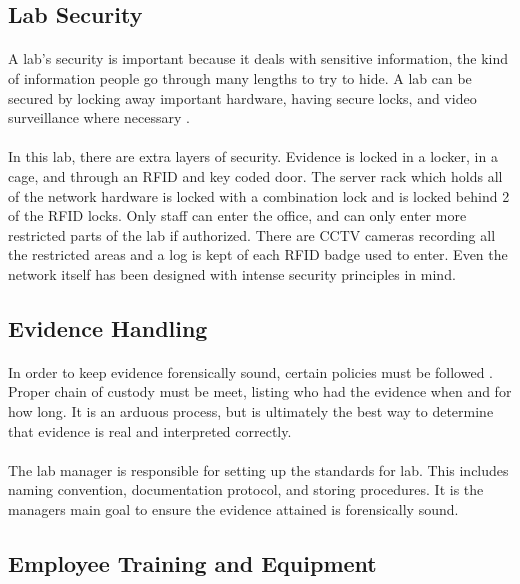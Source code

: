 \documentclass[12pt]{article}
\begin{document}
\subsection{Lab Security}
\paragraph{}
A lab's security is important because it deals with sensitive information, the kind of information people go through many lengths to try to hide.  
A lab can be secured by locking away important hardware, having secure locks, and video surveillance where necessary \cite{website}.
\paragraph{}
In this lab, there are extra layers of security.
Evidence is locked in a locker, in a cage, and through an RFID and key coded door.
The server rack which holds all of the network hardware is locked with a combination lock and is locked behind 2 of the RFID locks.
Only staff can enter the office, and can only enter more restricted parts of the lab if authorized.
There are CCTV cameras recording all the restricted areas and a log is kept of each RFID badge used to enter.
Even the network itself has been designed with intense security principles in mind.

\subsection{Evidence Handling}
\paragraph{}
In order to keep evidence forensically sound, certain policies must be followed \cite{hayes}. 
Proper chain of custody must be meet, listing who had the evidence when and for how long.  
It is an arduous process, but is ultimately the best way to determine that evidence is real and interpreted correctly.
\paragraph{}
The lab manager is responsible for setting up the standards for lab.
This includes naming convention, documentation protocol, and storing procedures.
It is the managers main goal to ensure the evidence attained is forensically sound.
\subsection{Employee Training and Equipment} 
\end{document}
